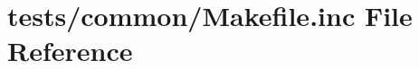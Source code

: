 \hypertarget{tests_2common_2_makefile_8inc}{\section{tests/common/\+Makefile.inc File Reference}
\label{tests_2common_2_makefile_8inc}
}
